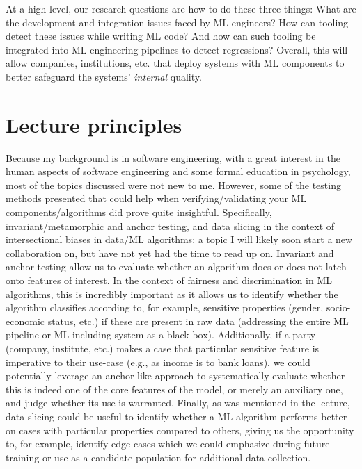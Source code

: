     At a high level, our research questions are how to do these three things: What are the development and integration issues faced by ML engineers? How can tooling detect these issues while writing ML code? And how can such tooling be integrated into ML engineering pipelines to detect regressions?
    Overall, this will allow companies, institutions, etc. that deploy systems with ML components to better safeguard the systems' \textit{internal} quality.


\section*{Lecture principles}


    Because my background is in software engineering, with a great interest in the human aspects of software engineering and some formal education in psychology, most of the topics discussed were not new to me.
    However, some of the testing methods presented that could help when verifying/validating your ML components/algorithms did prove quite insightful.
    Specifically, invariant/metamorphic and anchor testing, and data slicing in the context of intersectional biases in data/ML algorithms; a topic I will likely soon start a new collaboration on, but have not yet had the time to read up on.
    Invariant and anchor testing allow us to evaluate whether an algorithm does or does not latch onto features of interest.
    In the context of fairness and discrimination in ML algorithms, this is incredibly important as it allows us to identify whether the algorithm classifies according to, for example, sensitive properties (gender, socio-economic status, etc.) if these are present in raw data (addressing the entire ML pipeline or ML-including system as a black-box).
    Additionally, if a party (company, institute, etc.) makes a case that particular sensitive feature is imperative to their use-case (e.g., as income is to bank loans), we could potentially leverage an anchor-like approach to systematically evaluate whether this is indeed one of the core features of the model, or merely an auxiliary one, and judge whether its use is warranted.
    Finally, as was mentioned in the lecture, data slicing could be useful to identify whether a ML algorithm performs better on cases with particular properties compared to others, giving us the opportunity to, for example, identify edge cases which we could emphasize during future training or use as a candidate population for additional data collection.


